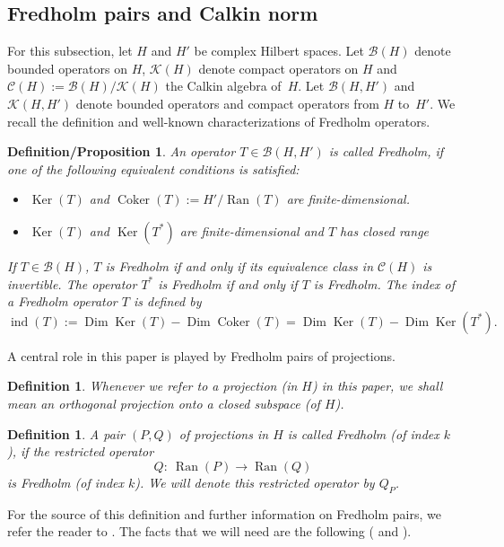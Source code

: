 \documentclass[pdftex]{sigma}
\numberwithin{equation}{section}
\newtheorem{defprop}[Theorem]{Definition/Proposition}
\newtheorem{Definition}[Theorem]{Definition}
\DeclareMathOperator{\Ran}{Ran}
\DeclareMathOperator{\Ker}{Ker}
\DeclareMathOperator{\Coker}{Coker}
\DeclareMathOperator{\ind}{ind}
\DeclareMathOperator{\Dim}{Dim}
\begin{document}
	\subsection{Fredholm pairs and Calkin norm}
	For this subsection, let $H$ and $H'$ be complex Hilbert spaces. Let $\mathcal{B}(H)$ denote bounded operators on $H$, $\mathcal{K}(H)$ denote compact operators on $H$ and $\mathcal C(H):= \mathcal{B}(H)/\mathcal{K}(H)$ the Calkin algebra of~$H$. Let $\mathcal{B}(H,H')$ and $\mathcal{K}(H,H')$ denote bounded operators and compact operators from $H$ to~$H'$.
	We recall the definition and well-known characterizations of Fredholm operators.
	\begin{defprop}
		An operator $T\in \mathcal{B}(H,H')$ is called Fredholm, if one of the following equivalent conditions is satisfied:
		\begin{itemize}\itemsep=0pt
			\item $\Ker(T)$ and $\Coker(T):=H'/\Ran(T)$ are finite-dimensional.
			\item $\Ker(T)$ and $\Ker(T^*)$ are finite-dimensional and $T$ has closed range
		\end{itemize}
		If $T\in \mathcal{B}(H)$, $T$ is Fredholm if and only if its equivalence class in $\mathcal{C}(H)$ is invertible. The operator $T^*$ is Fredholm if and only if $T$ is Fredholm. The index of a Fredholm operator $T$ is defined by
		\[\ind(T):=\Dim\Ker(T)-\Dim\Coker(T)=\Dim\Ker(T)-\Dim\Ker(T^*).\]
	\end{defprop}
	A central role in this paper is played by Fredholm pairs of projections.
	\begin{Definition}
		Whenever we refer to a projection (in $H$) in this paper, we shall mean an orthogonal projection onto a closed subspace (of $H$).
	\end{Definition}
	\begin{Definition}
		A pair $(P,Q)$ of projections in $H$ is called Fredholm (of index $k$), if the restricted operator
		\[Q\colon\ \Ran(P)\rightarrow\Ran(Q)\]
		is Fredholm (of index $k$). We will denote this restricted operator by $Q_P$.
	\end{Definition}
	 For the source of this definition and further information on Fredholm pairs, we refer the reader to \cite{ASS}. The facts that we will need are the following (\cite[Theorem~3.4 and Proposition~3.1]{ASS} and \cite[Lemma~3.2]{LFP}).
\end{document}
